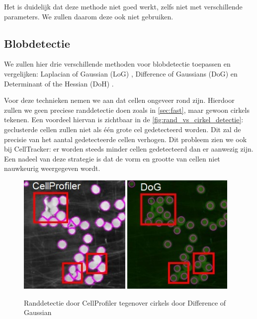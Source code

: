 \documentclass{article}
\begin{document}
\begin{multicols}{2}
Het is duidelijk dat deze methode niet goed werkt, zelfs niet met verschillende parameters. We zullen daarom deze ook niet gebruiken.

\subsection{Blobdetectie}
We zullen hier drie verschillende methoden voor blobdetectie toepassen en vergelijken: Laplacian of Gaussian (LoG) \cite{ref_log}, Difference of Gaussians (DoG) \cite{ref_dog} en Determinant of the Hessian (DoH) \cite{ref_doh}.

Voor deze technieken nemen we aan dat cellen ongeveer rond zijn. Hierdoor zullen we geen preciese randdetectie doen zoals in \autoref{sec:fast},  maar gewoon cirkels tekenen. Een voordeel hiervan is zichtbaar in de \autoref{fig:rand_vs_cirkel_detectie}: geclusterde cellen zullen niet als één grote cel gedetecteerd worden. Dit zal de precisie van het aantal gedetecteerde cellen verhogen. Dit probleem zien we ook bij CellTracker: er worden steeds minder cellen gedetecteerd dan er aanwezig zijn. Een nadeel van deze strategie is dat de vorm en grootte van cellen niet nauwkeurig weergegeven wordt.
\begin{figure}[H]
\centering
\includegraphics[width=0.48\textwidth]{images/concurrent_meerdere_cellen.jpg}
\includegraphics[width=0.473\textwidth]{images/onze_D_DOG_MSER_verschillende_cellen.jpg}
\caption{\label{fig:rand_vs_cirkel_detectie}Randdetectie door CellProfiler tegenover cirkels door Difference of Gaussian}
\end{figure}


\end{multicols}
\end{document}
